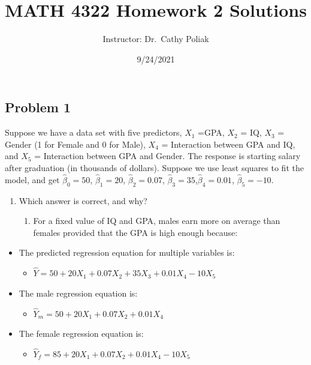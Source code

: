 \documentclass[
]{article}
\title{MATH 4322 Homework 2 Solutions}
\author{Instructor: Dr.~Cathy Poliak}
\date{9/24/2021}
\providecommand{\tightlist}{%
  \setlength{\itemsep}{0pt}\setlength{\parskip}{0pt}}
\begin{document}
\maketitle

\hypertarget{problem-1}{%
\subsection{Problem 1}\label{problem-1}}

Suppose we have a data set with five predictors, \(X_1\) =GPA, \(X_2\) =
IQ, \(X_3\) = Gender (1 for Female and 0 for Male), \(X_4\) =
Interaction between GPA and IQ, and \(X_5\) = Interaction between GPA
and Gender. The response is starting salary after graduation (in
thousands of dollars). Suppose we use least squares to fit the model,
and get \(\hat{\beta}_0 = 50\), \(\hat{\beta}_1 = 20\),
\(\hat{\beta}_2= 0.07\),
\(\hat{\beta}_3 = 35\),\(\hat{\beta}_4 = 0.01\),
\(\hat{\beta}_5 = -10\).

\begin{enumerate}
\def\labelenumi{(\alph{enumi})}
\tightlist
\item
  Which answer is correct, and why?

  \begin{enumerate}
  \def\labelenumii{\roman{enumii}.}
  \setcounter{enumii}{2}
  \tightlist
  \item
    For a fixed value of IQ and GPA, males earn more on average than
    females provided that the GPA is high enough because:
  \end{enumerate}
\end{enumerate}

\begin{itemize}
\tightlist
\item
  The predicted regression equation for multiple variables is:

  \begin{itemize}
  \tightlist
  \item
    \(\hat{Y} = 50 + 20X_1 + 0.07X_2 + 35X_3 + 0.01X_4 - 10X_5\)\\
  \end{itemize}
\item
  The male regression equation is:

  \begin{itemize}
  \tightlist
  \item
    \(\hat{Y}_m = 50 + 20X_1 + 0.07X_2 + 0.01X_4\)\\
  \end{itemize}
\item
  The female regression equation is:

  \begin{itemize}
  \tightlist
  \item
    \(\hat{Y}_f = 85 + 20X_1 + 0.07X_2 + 0.01X_4 - 10X_5\)
  \end{itemize}
\end{itemize}
\end{document}
